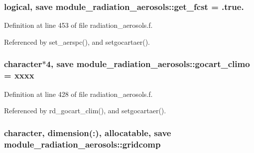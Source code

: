 \subsubsection[{\texorpdfstring{get\+\_\+fcst}{get_fcst}}]{\setlength{\rightskip}{0pt plus 5cm}logical, save module\+\_\+radiation\+\_\+aerosols\+::get\+\_\+fcst = .true.\hspace{0.3cm}{\ttfamily [private]}}\hypertarget{namespacemodule__radiation__aerosols_a36f851e49de5e1f7da38da5fa6ea445c}{}\label{namespacemodule__radiation__aerosols_a36f851e49de5e1f7da38da5fa6ea445c}


Definition at line 453 of file radiation\+\_\+aerosols.\+f.



Referenced by set\+\_\+aerspc(), and setgocartaer().

\subsubsection[{\texorpdfstring{gocart\+\_\+climo}{gocart_climo}}]{\setlength{\rightskip}{0pt plus 5cm}character$\ast$4, save module\+\_\+radiation\+\_\+aerosols\+::gocart\+\_\+climo = \textquotesingle{}xxxx\textquotesingle{}\hspace{0.3cm}{\ttfamily [private]}}\hypertarget{namespacemodule__radiation__aerosols_ab8118108e60a4795a8caa5af71232399}{}\label{namespacemodule__radiation__aerosols_ab8118108e60a4795a8caa5af71232399}


Definition at line 428 of file radiation\+\_\+aerosols.\+f.



Referenced by rd\+\_\+gocart\+\_\+clim(), and setgocartaer().

\subsubsection[{\texorpdfstring{gridcomp}{gridcomp}}]{\setlength{\rightskip}{0pt plus 5cm}character, dimension(\+:), allocatable, save module\+\_\+radiation\+\_\+aerosols\+::gridcomp\hspace{0.3cm}{\ttfamily [private]}}\hypertarget{namespacemodule__radiation__aerosols_a48c2c6c9c509f5c37fea5d788040ad7a}{}\label{namespacemodule__radiation__aerosols_a48c2c6c9c509f5c37fea5d788040ad7a}


